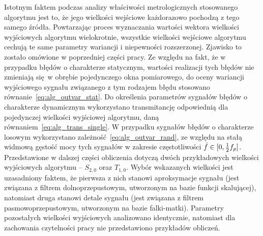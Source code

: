 Istotnym faktem podczas analizy właściwości metrologicznych stosowanego algorytmu jest to, że jego wielkości wejściowe każdorazowo pochodzą z tego samego źródła. Powtarzając proces wyznaczania wartości wektora wielkości wyjściowych algorytmu wielokrotnie, wszystkie wielkości wejściowe algorytmu cechują te same parametry wariancji i niepewności rozszerzonej. Zjawisko to zostało omówione w poprzedniej części pracy. Ze względu na fakt, że w przypadku błędów o charakterze statycznym, wartości realizacji tych błędów nie zmieniają się w obrębie pojedynczego okna pomiarowego, do oceny wariancji wyjściowego sygnału związanego z tym rodzajem błędu stosowano równanie~\eqref{eq:alg_outvar_stat}. Do określenia parametrów sygnałów błędów o charakterze dynamicznym wykorzystano transmitancję odpowiednią dla pojedynczej wielkości wyjściowej algorytmu, daną równaniem~\eqref{eq:alg_trans_single}. W przypadku sygnałów błędów o charakterze losowym wykorzystano zależność~\eqref{eq:alg_outvar_rand}, ze względu na stałą widmową gęstość mocy tych sygnałów w zakresie częstotliwości $\hat{f} \in \interval{0}{\frac{1}{2} f_{p}}$. Przedstawione w dalszej części obliczenia dotyczą dwóch przykładowych wielkości wyjściowych algorytmu -- $S_{2,0}$ oraz $T_{1,0}$. Wybór wskazanych wielkości jest uzasadniony faktem, że pierwsza z nich stanowi aproksymacje sygnału (jest związana z filtrem dolnoprzepustowym, utworzonym na bazie funkcji skalującej), natomiast druga stanowi detale sygnału (jest związana z filtrem pasmowoprzepustowym, utworzonym na bazie falki-matki). Parametry pozostałych wielkości wyjściowych analizowano identycznie, natomiast dla zachowania czytelności pracy nie przedstawiono przykładów obliczeń.

